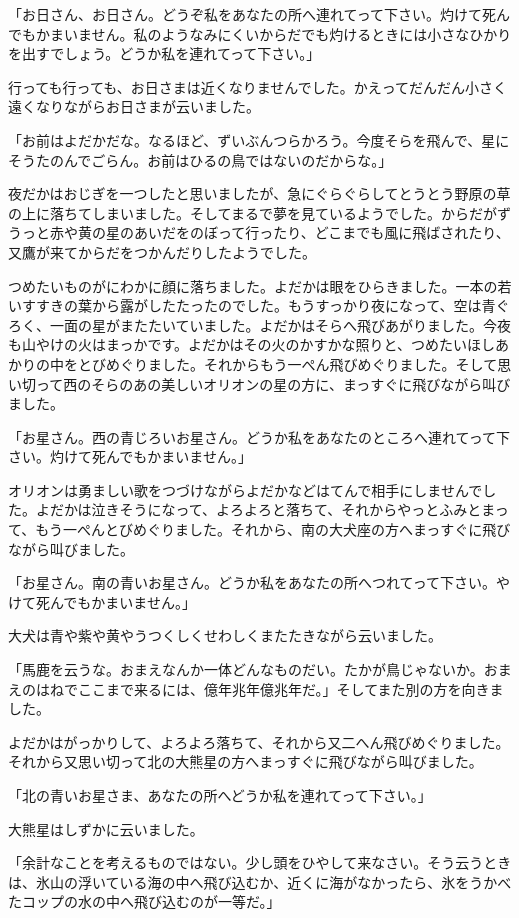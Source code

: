 \documentclass[a4paper, platex, dvipdfmx]{jsarticle}
\begin{document}
「お日さん、お日さん。どうぞ私をあなたの所へ連れてって下さい。灼けて死んでもかまいません。私のようなみにくいからだでも灼けるときには小さなひかりを出すでしょう。どうか私を連れてって下さい。」

行っても行っても、お日さまは近くなりませんでした。かえってだんだん小さく遠くなりながらお日さまが云いました。

「お前はよだかだな。なるほど、ずいぶんつらかろう。今度そらを飛んで、星にそうたのんでごらん。お前はひるの鳥ではないのだからな。」

夜だかはおじぎを一つしたと思いましたが、急にぐらぐらしてとうとう野原の草の上に落ちてしまいました。そしてまるで夢を見ているようでした。からだがずうっと赤や黄の星のあいだをのぼって行ったり、どこまでも風に飛ばされたり、又鷹が来てからだをつかんだりしたようでした。

つめたいものがにわかに顔に落ちました。よだかは眼をひらきました。一本の若いすすきの葉から露がしたたったのでした。もうすっかり夜になって、空は青ぐろく、一面の星がまたたいていました。よだかはそらへ飛びあがりました。今夜も山やけの火はまっかです。よだかはその火のかすかな照りと、つめたいほしあかりの中をとびめぐりました。それからもう一ぺん飛びめぐりました。そして思い切って西のそらのあの美しいオリオンの星の方に、まっすぐに飛びながら叫びました。

「お星さん。西の青じろいお星さん。どうか私をあなたのところへ連れてって下さい。灼けて死んでもかまいません。」

オリオンは勇ましい歌をつづけながらよだかなどはてんで相手にしませんでした。よだかは泣きそうになって、よろよろと落ちて、それからやっとふみとまって、もう一ぺんとびめぐりました。それから、南の大犬座の方へまっすぐに飛びながら叫びました。

「お星さん。南の青いお星さん。どうか私をあなたの所へつれてって下さい。やけて死んでもかまいません。」

大犬は青や紫や黄やうつくしくせわしくまたたきながら云いました。

「馬鹿を云うな。おまえなんか一体どんなものだい。たかが鳥じゃないか。おまえのはねでここまで来るには、億年兆年億兆年だ。」そしてまた別の方を向きました。

よだかはがっかりして、よろよろ落ちて、それから又二へん飛びめぐりました。それから又思い切って北の大熊星の方へまっすぐに飛びながら叫びました。

「北の青いお星さま、あなたの所へどうか私を連れてって下さい。」

大熊星はしずかに云いました。

「余計なことを考えるものではない。少し頭をひやして来なさい。そう云うときは、氷山の浮いている海の中へ飛び込むか、近くに海がなかったら、氷をうかべたコップの水の中へ飛び込むのが一等だ。」
\end{document}
